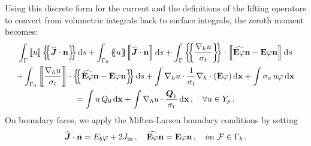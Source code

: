 \documentclass[../doc.tex]{subfiles}
\begin{document}
Using this discrete form for the current and the definitions of the lifting operators to convert from volumetric integrals back to surface integrals, the zeroth moment becomes: 
	\begin{multline} \label{dgvef:familynobc}
		\int_\Gamma \jump{u} \avg{\widehat{\vec{J}}\cdot\n} \ud s + \int_{\Gamma_0} \avg{u}\!\jump{\widehat{\vec{J}}\cdot\n} \ud s + \int_\Gamma \avg{\frac{\nablah u}{\sigma_t}} \cdot \jump{\widehat{\E\varphi}\n - \E\varphi\n} \ud s \\ 
		+ \int_{\Gamma_0} \jump{\frac{\nablah u}{\sigma_t}} \cdot \avg{\widehat{\E\varphi}\n - \E\varphi\n} \ud s + \int \nablah u \cdot \frac{1}{\sigma_t}\nablah\cdot\paren{\E\varphi} \ud \x + \int \sigma_a\, u \varphi \ud \x \\ 
		= \int u\, Q_0 \ud \x + \int \nablah u \cdot \frac{\vec{Q}_1}{\sigma_t} \ud \x \,, \quad \forall u \in Y_p \,. 
	\end{multline}
On boundary faces, we apply the Miften-Larsen boundary conditions by setting 
	\begin{equation} \label{dgvef:ml_bdr_flux}
		\widehat{\boldsymbol{J}}\cdot\boldsymbol{\mathrm{n}} = E_b \varphi + 2J_\text{in} \,, \quad \widehat{\boldsymbol{\mathrm{E}}\varphi}\boldsymbol{\mathrm{n}} = \boldsymbol{\mathrm{E}}\varphi\boldsymbol{\mathrm{n}} \,, \quad \text{on} \ \mathcal{F} \in \Gamma_b \,. 
	\end{equation}
\end{document}
